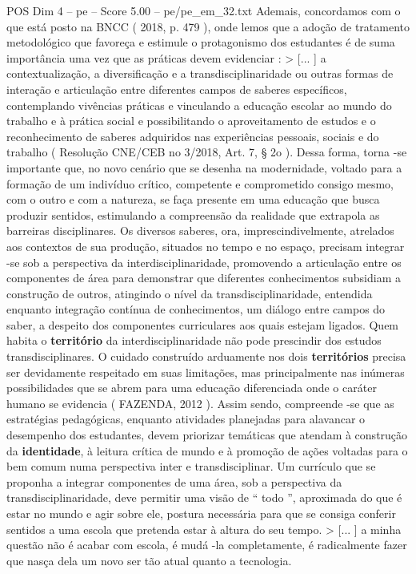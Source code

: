 \begin{textsample}{POS Dim 4 – pe – Score 5.00 – pe/pe\_em\_32.txt}
Ademais, concordamos com o que está posto na BNCC ( 2018, p. 479 ), onde lemos que a adoção de tratamento metodológico que favoreça e estimule o protagonismo dos estudantes é de suma importância uma vez que as práticas devem evidenciar : > [... ] a contextualização, a diversificação e a transdisciplinaridade ou outras formas de interação e articulação entre diferentes campos de saberes específicos, contemplando vivências práticas e vinculando a educação escolar ao mundo do trabalho e à prática social e possibilitando o aproveitamento de estudos e o reconhecimento de saberes adquiridos nas experiências pessoais, sociais e do trabalho ( Resolução CNE/CEB no 3/2018, Art. 7, § 2o ).
Dessa forma, torna -se importante que, no novo cenário que se desenha na modernidade, voltado para a formação de um indivíduo crítico, competente e comprometido consigo mesmo, com o outro e com a natureza, se faça presente em uma educação que busca produzir sentidos, estimulando a compreensão da realidade que extrapola as barreiras disciplinares.
Os diversos saberes, ora, imprescindivelmente, atrelados aos contextos de sua produção, situados no tempo e no espaço, precisam integrar -se sob a perspectiva da interdisciplinaridade, promovendo a articulação entre os componentes de área para demonstrar que diferentes conhecimentos subsidiam a construção de outros, atingindo o nível da transdisciplinaridade, entendida enquanto integração contínua de conhecimentos, um diálogo entre campos do saber, a despeito dos componentes curriculares aos quais estejam ligados.
Quem habita o \textbf{território} da interdisciplinaridade não pode prescindir dos estudos transdisciplinares.
O cuidado construído arduamente nos dois \textbf{territórios} precisa ser devidamente respeitado em suas limitações, mas principalmente nas inúmeras possibilidades que se abrem para uma educação diferenciada onde o caráter humano se evidencia ( FAZENDA, 2012 ).
Assim sendo, compreende -se que as estratégias pedagógicas, enquanto atividades planejadas para alavancar o desempenho dos estudantes, devem priorizar temáticas que atendam à construção da \textbf{identidade}, à leitura crítica de mundo e à promoção de ações voltadas para o bem comum numa perspectiva inter e transdisciplinar.
Um currículo que se proponha a integrar componentes de uma área, sob a perspectiva da transdisciplinaridade, deve permitir uma visão de “ todo ”, aproximada do que é estar no mundo e agir sobre ele, postura necessária para que se consiga conferir sentidos a uma escola que pretenda estar à altura do seu tempo. > [... ] a minha questão não é acabar com escola, é mudá -la completamente, é radicalmente fazer que nasça dela um novo ser tão atual quanto a tecnologia.

\end{textsample}
